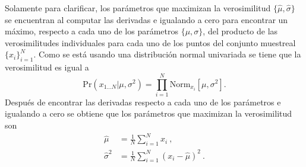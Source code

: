 \begin{enumerate}
\begin{solution}
        Solamente para clarificar, los parámetros que maximizan la verosimilitud $\{\hat{\mu}, \hat{\sigma}\}$ se encuentran al computar las derivadas e igualando a cero para encontrar un máximo, respecto a cada uno de los parámetros $\{\mu, \sigma\}$, del producto de las verosimilitudes individuales para cada uno de los puntos del conjunto muestreal $\{x_i\}_{i=1}^{N}$. Como se está usando una distribución normal univariada se tiene que la verosimilitud es igual a
        \begin{equation}
            \text{Pr}(x_{1 \ldots N} | \mu, \sigma^2) = \prod\limits_{i=1}^{N}\text{Norm}_{x_i} \left[\mu, \sigma^2\right].
        \end{equation}
        Después de encontrar las derivadas respecto a cada uno de los parámetros e igualando a cero se obtiene que los parámetros que maximizan la verosimilitud son
        \begin{align}
            \hat{\mu} & = \frac{1}{N} \sum\limits_{i=1}^{N} x_i\ ,\\
            \hat{\sigma}^2 & = \frac{1}{N} \sum\limits_{i=1}^{N} \left(x_i - \hat{\mu}\right)^2\ .
        \end{align}
        

\end{solution}
\end{enumerate}

